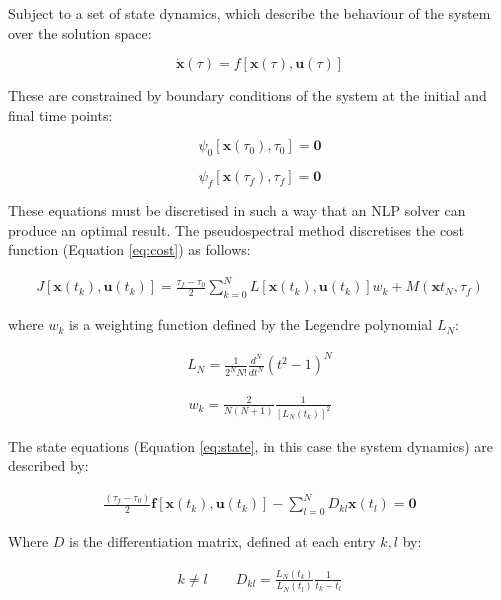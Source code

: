 Subject to a set of state dynamics, which describe the behaviour of the system over the solution space: 

\begin{equation} \label{eq:state}
\dot{\textbf{x}}(\tau) = f[\textbf{x}(\tau),\textbf{u}(\tau)]
\end{equation}

These are constrained by boundary conditions of the system at the initial and final time points:

\begin{equation}
\psi_0[\textbf{x}(\tau_0), \tau_0] = \textbf{0}
\end{equation}

\begin{equation} \label{eq:2}
\psi_f[\textbf{x}(\tau_f), \tau_f] = \textbf{0}
\end{equation}

These equations must be discretised in such a way that an NLP solver can produce an optimal result. The pseudospectral method discretises the cost function (Equation \ref{eq:cost}) as follows:

\begin{eqnarray}
J[\textbf{x}(t_k),\textbf{u}(t_k)] = \frac{\tau_f - \tau_0}{2} \sum_{k=0}^{N}L[\textbf{x}(t_k),\textbf{u}(t_k)]w_k + M(\textbf{x}t_N,\tau_f)
\end{eqnarray}

where $ w_k $ is a weighting function defined by the Legendre polynomial $L_N$:

\begin{eqnarray}
L_N = \frac{1}{2^N N!} \frac{d^N}{dt^N}(t^2-1)^N
\end{eqnarray}

\begin{eqnarray}
w_k = \frac{2}{N(N+1)} \frac{1}{[L_N(t_k)]^2}
\end{eqnarray}

The state equations (Equation \ref{eq:state}, in this case the system dynamics) are described by:

\begin{eqnarray}
\frac{(\tau_f - \tau_0)}{2}\textbf{f}[\textbf{x}(t_k),\textbf{u}(t_k)] - \sum_{l=0}^{N} D_{kl} \textbf{x}(t_l) = \textbf{0}
\end{eqnarray}

Where $D$ is the differentiation matrix, defined at each entry $k,l$ by:

\begin{eqnarray}
k \neq l\qquad
D_{kl} = \frac{L_N(t_k)}{L_N(t_l)} \frac{1}{t_k - t_l}
\end{eqnarray}

